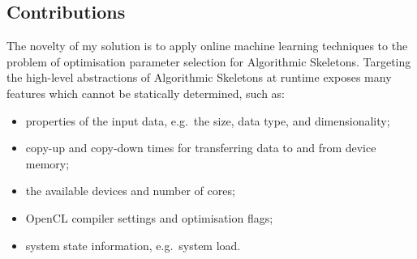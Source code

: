 \subsection{Contributions}

The novelty of my solution is to apply online machine learning
techniques to the problem of optimisation parameter selection for
Algorithmic Skeletons. Targeting the high-level abstractions of
Algorithmic Skeletons at runtime exposes many features which cannot be
statically determined, such as:

\begin{itemize}
\itemsep0em
\item properties of the input data, e.g.\ the size, data type, and
  dimensionality;
\item copy-up and copy-down times for transferring data to and from
  device memory;
\item the available devices and number of cores;
\item OpenCL compiler settings and optimisation flags;
\item system state information, e.g.\ system load.
\end{itemize}

